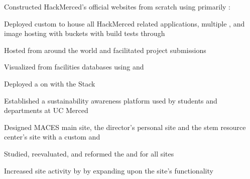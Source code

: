 \documentclass[]{hackathons}
\begin{document}
\begin{minipage}[t]{0.64\textwidth}
\begin{tightemize}
\item Constructed HackMerced's official websites from scratch using primarily : 
\item Deployed custom  to house all HackMerced related applications, multiple , and image hosting with  buckets with build tests through 
\item Hosted  from around the world and facilitated  project submissions
\end{tightemize}
\medskip

\begin{tightemize}
\item Visualized  from facilities databases using  and 
\item Deployed a  on  with the  Stack
\item Established a sustainability awareness platform used by  students and  departments at UC Merced
\end{tightemize}
\medskip

\begin{tightemize}
\item Designed MACES main site, the director's personal site and the stem resource center's site with a custom  and 
\item Studied, reevaluated, and reformed the  and  for all sites
\item Increased site activity by  by expanding upon the site's functionality
\end{tightemize}
\small



\end{minipage}
\end{document}
